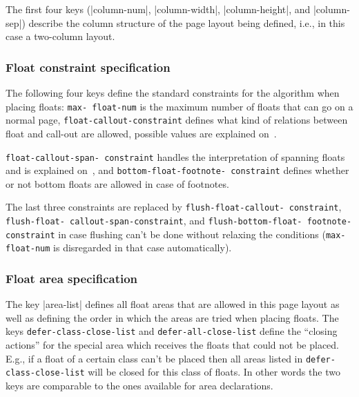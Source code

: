 \documentclass[twocolumn]{article}
\begin{document}
The first four keys (|column-num|, |column-width|, |column-height|,
and  |column-sep|) describe the column structure of the page layout
being defined, i.e., in this case a two-column layout.

\subsubsection{Float constraint specification}

The following four keys define the standard constraints for the
algorithm when placing floats: \texttt{max-\allowbreak
float-\allowbreak num} is the maximum number of floats that can go on
a normal page,
\texttt{float-\allowbreak callout-\allowbreak constraint} defines 
what kind of relations between float and call-out are allowed,
possible values are explained on~.

\texttt{float-\allowbreak callout-\allowbreak span-\allowbreak
constraint} handles the interpretation of spanning floats and is
explained on~, and
\texttt{bottom-\allowbreak float-\allowbreak footnote-\allowbreak
constraint} defines whether or not bottom floats are allowed in case
of footnotes. 

The last three constraints are replaced by
\texttt{flush-\allowbreak float-\allowbreak callout-\allowbreak
constraint}, \texttt{flush-\allowbreak float-\allowbreak
 callout-\allowbreak span-\allowbreak constraint}, and
\texttt{flush-\allowbreak bottom-\allowbreak float-\allowbreak
footnote-\allowbreak constraint} in case flushing can't be done
without relaxing the conditions (\texttt{max-\allowbreak
float-\allowbreak num} is disregarded in that case automatically).

\subsubsection{Float area specification}

The key |area-list| defines all float areas that are allowed in this
page layout as well as defining the order in which the areas are tried
when placing floats.  
The keys \texttt{defer-class-close-list} and
\texttt{defer-all-close-list} define the ``closing actions'' for the
special area which receives the floats that could not be placed. E.g.,
if a float of a certain class can't be placed then all areas listed in
\texttt{defer-class-close-list} will be closed for this class of
floats. In other
words the two keys are comparable to the ones available for area
declarations.
\end{document}
